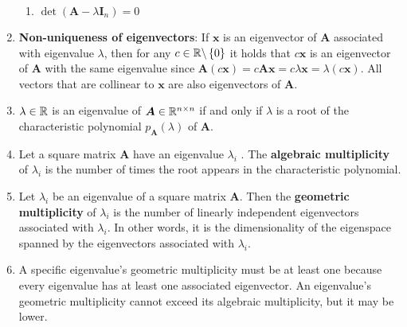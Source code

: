\begin{enumerate}
\begin{enumerate}
        \item $\det(\bm{A} - \lambda \bm{I}_n) = 0$
        \hfill \cite{mfml/book/mml/Deisenroth-Faisal-Ong}
    \end{enumerate}

    \item \textbf{Non-uniqueness of eigenvectors}: If $\bm{x}$ is an eigenvector of $\bm{A}$ associated with eigenvalue $\lambda$, then for any $c \in \mathbb{R}\backslash \left\{0\right\}$ it holds that $c\bm{x}$ is an eigenvector of $\bm{A}$ with the same eigenvalue since $\bm{A}(c\bm{x}) = c\bm{Ax} = c\lambda\bm{x} = \lambda(c\bm{x})$. All vectors that are collinear to $\bm{x}$ are also eigenvectors of $\bm{A}$.
    \hfill \cite{mfml/book/mml/Deisenroth-Faisal-Ong}

    \item 
    \begin{theorem}
        $\lambda  \in \mathbb{R}$ is an eigenvalue of $\bm{A} \in \mathbb{R}^{n\times n}$ if and only if $\lambda$  is a root of the characteristic polynomial $p_{\bm{A}}(\lambda )$ of $\bm{A}$.
        \hfill \cite{mfml/book/mml/Deisenroth-Faisal-Ong}
    \end{theorem}

    \item 
    \begin{definition}
        Let a square matrix $\bm{A}$ have an eigenvalue $\lambda_i$ . 
        The \textbf{algebraic multiplicity} of $\lambda_i$ is the number of times the root appears in the characteristic polynomial.
        \hfill \cite{mfml/book/mml/Deisenroth-Faisal-Ong}
    \end{definition}

    \item
    \begin{definition}
        Let $\lambda_i$ be an eigenvalue of a square matrix $\bm{A}$. 
        Then the \textbf{geometric multiplicity} of $\lambda_i$ is the number of linearly independent eigenvectors associated with $\lambda_i$. 
        In other words, it is the dimensionality of the eigenspace spanned by the eigenvectors associated with $\lambda_i$.
        \hfill \cite{mfml/book/mml/Deisenroth-Faisal-Ong}
    \end{definition}

    \item A specific eigenvalue’s geometric multiplicity must be at least one because every eigenvalue has at least one associated eigenvector. 
    An eigenvalue’s geometric multiplicity cannot exceed its algebraic multiplicity, but it may be lower.


\end{enumerate}
